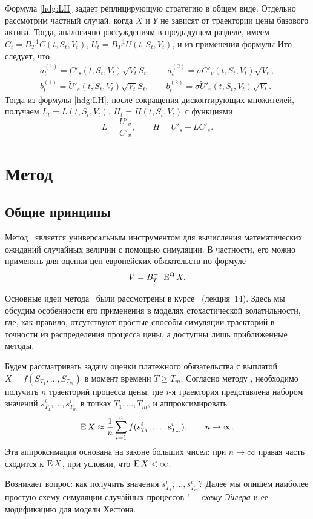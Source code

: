Формула \eqref{hdg:LH} задает реплицирующую стратегию в общем виде.
Отдельно рассмотрим частный случай, когда $X$ и $Y$ не зависят от траектории цены базового актива. 
Тогда, аналогично рассуждениям в предыдущем разделе, имеем $\tilde C_t = B_{T}^{-1} C(t,S_t,V_t)$, $\tilde U_t = B_{T}^{-1} U(t,S_t,V_t)$, и из применения формулы Ито следует, что 
\begin{gather*}
a_t^{(1)} = \tilde C'_s(t,S_t,V_t) \sqrt{V_t}S_t, \qquad
a_t^{(2)} = \sigma \tilde C'_v(t,S_t,V_t)\sqrt{V_t},\\
b_t^{(1)} = \tilde U'_s(t,S_t,V_t) \sqrt{V_t}S_t, \qquad
b_t^{(2)} = \sigma \tilde U'_v(t,S_t,V_t)\sqrt{V_t}.
\end{gather*}
Тогда из формулы \eqref{hdg:LH}, после сокращения дисконтирующих множителей, получаем $L_t = L(t,S_t,V_t)$, $H_t = H(t,S_t,V_t)$ с функциями
\[
L = \frac{U'_v}{C'_v}, \qquad 
H = U'_s - L C'_s.
\]


\section{Метод \mc}
\subsection{Общие принципы}
Метод \mc\ является универсальным инструментом для вычисления математических ожиданий случайных величин с помощью симуляции. 
В частности, его можно применять для оценки цен европейских обязательств по формуле
\[
V = B_T^{-1}\operatorname{E}^{\mathrm{Q}} X.
\]

Основные идеи метода \mc\ были рассмотрены в курсе \intro\ (лекция~14). 
Здесь мы обсудим особенности его применения в моделях стохастической волатильности, где, как правило, отсутствуют простые способы симуляции траекторий в точности из распределения процесса цены, а доступны лишь приближенные методы.

Будем рассматривать задачу оценки платежного обязательства с выплатой $X=f(S_{T_1},\dots, S_{T_m})$ в момент времени $T\ge T_m$. 
Согласно методу \mc, необходимо получить $n$ траекторий процесса цены, где $i$-я траектория представлена набором значений $s_{T_1}^i, \dots, s_{T_m}^i$ в точках $T_1,\dots,T_m$, и аппроксимировать
\[
\operatorname{E} X \approx \frac1n \sum_{i=1}^n f(s_{T_1}^i, \dots, s_{T_m}^i), \qquad n\to\infty.
\]
Эта аппроксимация основана на законе больших чисел: при $n\to\infty$ правая часть сходится к $\operatorname{E} X$, при условии, что $\operatorname{E} X<\infty$.

Возникает вопрос: как получить значения $s_{T_1}^i, \dots, s_{T_m}^i$?  
Далее мы опишем наиболее простую схему симуляции случайных процессов "--- \emph{схему Эйлера} и ее модификацию для модели Хестона.

